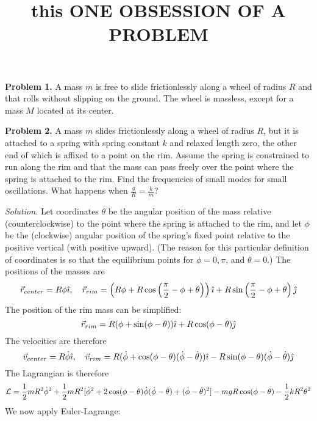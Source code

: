 \documentclass[12pt]{scrartcl}
\begin{document}
\title{this ONE OBSESSION OF A PROBLEM}

\textbf{Problem 1.} A mass $m$ is free to slide frictionlessly along a wheel of radius $R$ and that rolls without slipping on the ground. The wheel is massless, except for a mass $M$ located
at its center.

\textbf{Problem 2.} A mass $m$ slides frictionlessly along a wheel of radius $R$, but it is attached to a spring with spring constant $k$ and relaxed length zero, the other end of which is affixed to a point on the rim. Assume the spring is constrained to run along the rim and that the mass can pass freely over the point where the spring is attached to the rim. Find the frequencies of small modes for small oscillations. What happens when $\frac g R = \frac k m$?

\textit{Solution.} Let coordinates $\theta$ be the angular position of the mass relative (counterclockwise) to the point where the spring is attached to the rim, and let $\phi$ be the (clockwise) angular position of the spring's fixed point relative to the positive vertical (with positive upward). (The reason for this particular definition of coordinates is so that the equilibrium points for $\phi = 0, \pi$, and $\theta = 0$.) The positions of the masses are 
\[
    \vec r_{center} = R\phi \hat \imath, \quad \vec r_{rim} = \left(R\phi + R \cos\left(\frac \pi 2 - \phi + \theta \right)\right) \hat \imath + R \sin\left(\frac \pi 2 - \phi + \theta \right) \hat \jmath
\]
The position of the rim mass can be simplified:
\[
    \vec r_{rim} = R(\phi + \sin(\phi - \theta)) \hat \imath + R \cos(\phi - \theta)\hat \jmath
\]
The velocities are therefore
\[
    \vec v_{center} = R\dot\phi \hat \imath, \quad \vec v_{rim} = R(\dot \phi + \cos(\phi - \theta) (\dot \phi - \dot \theta)) \hat \imath - R \sin(\phi - \theta)(\dot \phi - \dot \theta)\hat \jmath
\]
The Lagrangian is therefore
\[
    \mathcal{L} = \frac 12 m R^2 \dot\phi^2 + \frac 12 mR^2 [\dot\phi^2 + 2 \cos(\phi - \theta) \dot \phi (\dot \phi - \dot \theta) + (\dot \phi - \dot \theta)^2] - mgR \cos(\phi - \theta) - \frac 12 kR^2\theta^2
\]
We now apply Euler-Lagrange:
\end{document}
